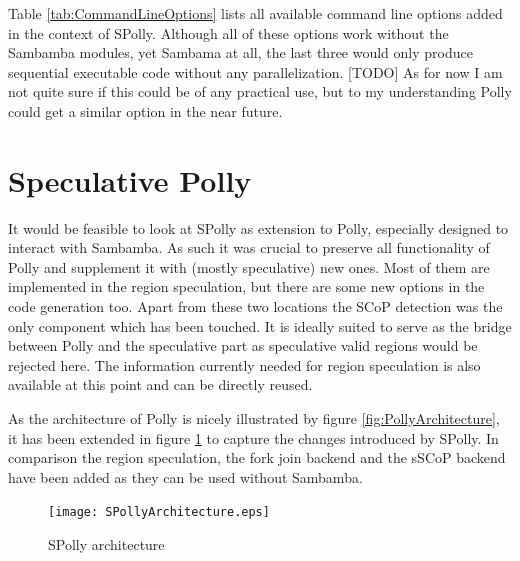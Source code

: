 \begin{shaded}
Table \ref{tab:CommandLineOptions} lists all available command line options 
added in the context of SPolly. Although all of these options work 
without the Sambamba modules, yet Sambama at all, the last three would only 
produce sequential executable code without any parallelization. 
[TODO] As for now I am not quite sure if this could be of any practical use, 
but to my understanding Polly could get a similar option in the near future. 





\section{Speculative Polly}
It would be feasible to look at SPolly as extension to Polly, especially designed
to interact with Sambamba. As such it was crucial to preserve all functionality 
of Polly and supplement it with (mostly speculative) new ones. Most of them are
implemented in the region speculation, but there are some new options in the 
code generation too. Apart from these two locations the SCoP detection was the 
only component which has been touched. It is ideally suited to serve as the 
bridge between Polly and the speculative part as speculative valid regions 
would be rejected here. The information currently needed for region speculation
is also available at this point and can be directly reused. 

As the architecture of Polly is nicely illustrated by figure 
\ref{fig:PollyArchitecture}, it has been extended in figure 
\ref{fig:SPollyArchitecture} to capture the changes introduced by SPolly. 
In comparison the region speculation, the fork join backend and the sSCoP
backend have been added as they can be used without Sambamba. 
\end{shaded}

\begin{figure}[htbp]
  \centering
  \texttt{[image: SPollyArchitecture.eps]}
  \caption{SPolly architecture}
  \label{fig:SPollyArchitecture}  
\end{figure}

